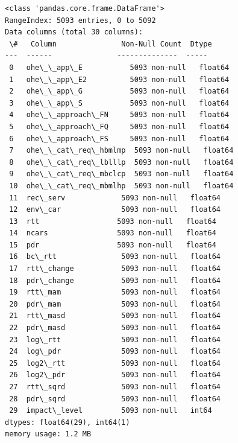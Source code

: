 \documentclass[11pt]{article}
\begin{document}
    \begin{Verbatim}[commandchars=\\\{\}]
<class 'pandas.core.frame.DataFrame'>
RangeIndex: 5093 entries, 0 to 5092
Data columns (total 30 columns):
 \#   Column               Non-Null Count  Dtype
---  ------               --------------  -----
 0   ohe\_\_app\_E           5093 non-null   float64
 1   ohe\_\_app\_E2          5093 non-null   float64
 2   ohe\_\_app\_G           5093 non-null   float64
 3   ohe\_\_app\_S           5093 non-null   float64
 4   ohe\_\_approach\_FN     5093 non-null   float64
 5   ohe\_\_approach\_FQ     5093 non-null   float64
 6   ohe\_\_approach\_FS     5093 non-null   float64
 7   ohe\_\_cat\_req\_hbmlmp  5093 non-null   float64
 8   ohe\_\_cat\_req\_lblllp  5093 non-null   float64
 9   ohe\_\_cat\_req\_mbclcp  5093 non-null   float64
 10  ohe\_\_cat\_req\_mbmlhp  5093 non-null   float64
 11  rec\_serv             5093 non-null   float64
 12  env\_car              5093 non-null   float64
 13  rtt                  5093 non-null   float64
 14  ncars                5093 non-null   float64
 15  pdr                  5093 non-null   float64
 16  bc\_rtt               5093 non-null   float64
 17  rtt\_change           5093 non-null   float64
 18  pdr\_change           5093 non-null   float64
 19  rtt\_mam              5093 non-null   float64
 20  pdr\_mam              5093 non-null   float64
 21  rtt\_masd             5093 non-null   float64
 22  pdr\_masd             5093 non-null   float64
 23  log\_rtt              5093 non-null   float64
 24  log\_pdr              5093 non-null   float64
 25  log2\_rtt             5093 non-null   float64
 26  log2\_pdr             5093 non-null   float64
 27  rtt\_sqrd             5093 non-null   float64
 28  pdr\_sqrd             5093 non-null   float64
 29  impact\_level         5093 non-null   int64
dtypes: float64(29), int64(1)
memory usage: 1.2 MB
    \end{Verbatim}
\end{document}
